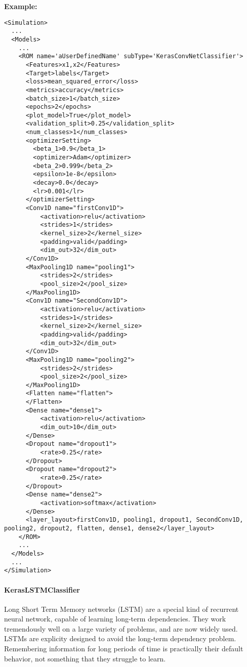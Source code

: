 \textbf{Example:}
\begin{lstlisting}[style=XML,morekeywords={name,subType}]
<Simulation>
  ...
  <Models>
    ...
    <ROM name='aUserDefinedName' subType='KerasConvNetClassifier'>
      <Features>x1,x2</Features>
      <Target>labels</Target>
      <loss>mean_squared_error</loss>
      <metrics>accuracy</metrics>
      <batch_size>1</batch_size>
      <epochs>2</epochs>
      <plot_model>True</plot_model>
      <validation_split>0.25</validation_split>
      <num_classes>1</num_classes>
      <optimizerSetting>
        <beta_1>0.9</beta_1>
        <optimizer>Adam</optimizer>
        <beta_2>0.999</beta_2>
        <epsilon>1e-8</epsilon>
        <decay>0.0</decay>
        <lr>0.001</lr>
      </optimizerSetting>
      <Conv1D name="firstConv1D">
          <activation>relu</activation>
          <strides>1</strides>
          <kernel_size>2</kernel_size>
          <padding>valid</padding>
          <dim_out>32</dim_out>
      </Conv1D>
      <MaxPooling1D name="pooling1">
          <strides>2</strides>
          <pool_size>2</pool_size>
      </MaxPooling1D>
      <Conv1D name="SecondConv1D">
          <activation>relu</activation>
          <strides>1</strides>
          <kernel_size>2</kernel_size>
          <padding>valid</padding>
          <dim_out>32</dim_out>
      </Conv1D>
      <MaxPooling1D name="pooling2">
          <strides>2</strides>
          <pool_size>2</pool_size>
      </MaxPooling1D>
      <Flatten name="flatten">
      </Flatten>
      <Dense name="dense1">
          <activation>relu</activation>
          <dim_out>10</dim_out>
      </Dense>
      <Dropout name="dropout1">
          <rate>0.25</rate>
      </Dropout>
      <Dropout name="dropout2">
          <rate>0.25</rate>
      </Dropout>
      <Dense name="dense2">
          <activation>softmax</activation>
      </Dense>
      <layer_layout>firstConv1D, pooling1, dropout1, SecondConv1D, pooling2, dropout2, flatten, dense1, dense2</layer_layout>
    </ROM>
    ...
  </Models>
  ...
</Simulation>
\end{lstlisting}

\paragraph{KerasLSTMClassifier}
\label{KerasClassifier}

Long Short Term Memory networks (LSTM) are a special kind of recurrent neural network, capable
of learning long-term dependencies. They work tremendously well on a large variety of problems, and
are now widely used. LSTMs are explicity designed to avoid the long-term dependency problem. Remembering
information for long periods of time is practically their default behavior, not something that they
struggle to learn.

